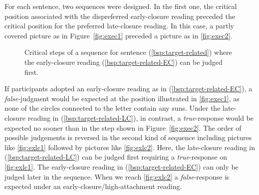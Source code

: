 \documentclass[fleqn,reqno,10pt,draft]{article}
\begin{document}
For each sentence, two sequences were designed. In the first one, the
critical position associated with the dispreferred early-closure
reading preceded the critical position for the preferred late-closure
reading. In this case, a partly covered picture as in
Figure~\ref{fig:exec1} preceded a picture as in \ref{fig:exec2}.
%
\begin{figure}[ht]
	\centering
	\caption[]{Critical steps of a sequence for sentence
          (\ref{bsp:target-related}) where the early-closure reading
          (\ref{bsp:target-related-EC}) can be judged first.}
	\label{fig:exec}
\end{figure}
%
If participants adopted an early-closure reading as in
(\ref{bsp:target-related-EC}), a \emph{false}-judgment would be
expected at the position illustrated in \ref{fig:exec1}, as none of
the circles connected to the letter contain any suns. Under the
late-closure reading in (\ref{bsp:target-related-LC}), in contrast, a
\emph{true}-response would be expected no sooner than in the step
shown in Figure~\ref{fig:exec2}. The order of possible judgements is
reversed in the second kind of sequence including pictures like
\ref{fig:exlc1} followed by pictures like \ref{fig:exlc2}. Here, the
late-closure reading in (\ref{bsp:target-related-LC}) can be judged
first requiring a \emph{true}-response on \ref{fig:exlc1}. The
early-closure reading in (\ref{bsp:target-related-EC}) can only be
judged later in the sequence. When we reach \ref{fig:exlc2} a
\emph{false}-response is expected under an
early-closure/high-attachment reading.
\end{document}
